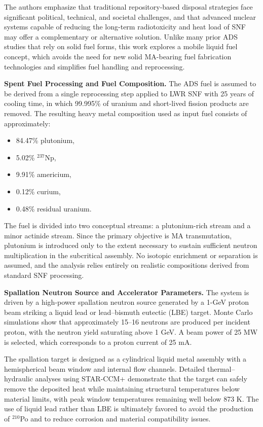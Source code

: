The authors emphasize that traditional repository-based disposal strategies face significant political, technical, and 
societal challenges, and that advanced nuclear systems capable of reducing the long-term radiotoxicity and heat load of 
SNF may offer a complementary or alternative solution. Unlike many prior ADS studies that rely on solid fuel forms, this 
work explores a mobile liquid fuel concept, which avoids the need for new solid MA-bearing fuel fabrication technologies and 
simplifies fuel handling and reprocessing.

\textbf{Spent Fuel Processing and Fuel Composition.}  
The ADS fuel is assumed to be derived from a single reprocessing step applied to LWR SNF with 25 years of cooling time, in 
which 99.995\% of uranium and short-lived fission products are removed. The resulting heavy metal composition used as input 
fuel consists of approximately:
\begin{itemize}
    \item 84.47\% plutonium,
    \item 5.02\% $^{237}$Np,
    \item 9.91\% americium,
    \item 0.12\% curium,
    \item 0.48\% residual uranium.
\end{itemize}

The fuel is divided into two conceptual streams: a plutonium-rich stream and a minor actinide stream. Since the primary 
objective is MA transmutation, plutonium is introduced only to the extent necessary to sustain sufficient neutron multiplication 
in the subcritical assembly. No isotopic enrichment or separation is assumed, and the analysis relies entirely on realistic 
compositions derived from standard SNF processing.

\textbf{Spallation Neutron Source and Accelerator Parameters.}  
The system is driven by a high-power spallation neutron source generated by a 1-GeV proton beam striking a liquid lead or 
lead--bismuth eutectic (LBE) target. Monte Carlo simulations show that approximately 15--16 neutrons are produced per incident 
proton, with the neutron yield saturating above 1 GeV. A beam power of 25 MW is selected, which corresponds to a proton current 
of 25 mA.

The spallation target is designed as a cylindrical liquid metal assembly with a hemispherical beam window and internal 
flow channels. Detailed thermal--hydraulic analyses using STAR-CCM+ demonstrate that the target can safely remove the 
deposited heat while maintaining structural temperatures below material limits, with peak window temperatures remaining 
well below 873 K. The use of liquid lead rather than LBE is ultimately favored to avoid the production of $^{210}$Po and to 
reduce corrosion and material compatibility issues.


